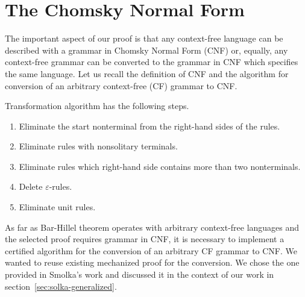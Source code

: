 \section{The Chomsky Normal Form}
\label{sec:cnf}

The important aspect of our proof is that any context-free language can be described with a grammar in Chomsky Normal Form (CNF) or, equally, any context-free grammar can be converted to the grammar in CNF which specifies the same language.
Let us recall the definition of CNF and the algorithm for conversion of an arbitrary context-free (CF) grammar to CNF.
{}

Transformation algorithm has the following steps.
\begin{enumerate}
\item Eliminate the start nonterminal from the right-hand sides of the rules.
\item Eliminate rules with nonsolitary terminals.
\item Eliminate rules which right-hand side contains more than two nonterminals.
\item Delete $\varepsilon$-rules.
\item Eliminate unit rules.
\end{enumerate}

As far as Bar-Hillel theorem operates with arbitrary context-free languages and the selected proof requires grammar in CNF, it is necessary to implement a certified algorithm for the conversion of an arbitrary CF grammar to CNF.
We wanted to reuse existing mechanized proof for the conversion.
We chose the one provided in Smolka's work and discussed it in the context of our work in section~\ref{sec:solka-generalized}.



